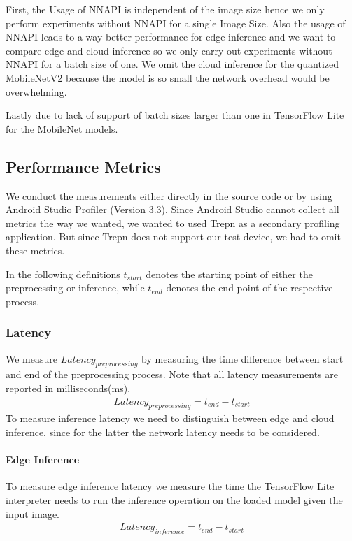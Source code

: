 First, the Usage of NNAPI is independent of the image size hence we only perform experiments without NNAPI for a single Image Size. Also the usage of NNAPI leads to a way better performance for edge inference and we want to compare edge and cloud inference so we only carry out experiments without NNAPI for a batch size of one.
We omit the cloud inference for the quantized MobileNetV2 because the model is so small the network overhead would be overwhelming.%

Lastly due to lack of support of batch sizes larger than one in TensorFlow Lite for the MobileNet models.
\subsection{Performance Metrics}
\label{chap:insta_measurements}
We conduct the measurements either directly in the source code or by using Android Studio Profiler (Version 3.3). Since Android Studio cannot collect all metrics the way we wanted, we wanted to used Trepn as a secondary profiling application. But since Trepn does not support our test device, we had to omit these metrics.

In the following definitions $t_{start}$ denotes the starting point of either the preprocessing or inference, while $t_{end}$ denotes the end point of the respective process.
\subsubsection{Latency}
We measure $Latency_{preprocessing}$ by measuring the time difference between start and end of the preprocessing process.
Note that all latency measurements are reported in milliseconds(ms).
\begin{equation*}
\begin{gathered}
Latency_{preprocessing} = t_{end} - t_{start}
\end{gathered}
\end{equation*}
To measure inference latency we need to distinguish between edge and cloud inference, since for the latter the network latency needs to be considered.

\paragraph{Edge Inference}To measure edge inference latency we measure the time the TensorFlow Lite interpreter needs to run the inference operation on the loaded model given the input image.
\begin{equation*}
\begin{gathered}
Latency_{inference} = t_{end} - t_{start}
\end{gathered}
\end{equation*}
